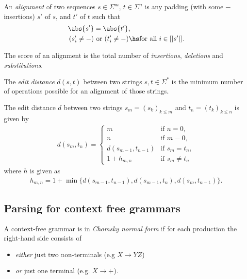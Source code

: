 \documentclass{article}
\begin{document}
\begin{definition}
	An \emph{alignment} of two sequences $s\in\Sigma^m$, $t\in\Sigma^n$ is
	any padding (with some $-$ insertions) $s'$ of $s$, and $t'$ of $t$ such that
	\begin{align*}
		\abs{s'}&=\abs{t'},\\
		(s'_i\not=-)&\text{ or }(t'_i\not=-)\hs\text{for all }i\in[|s'|].
	\end{align*}
\end{definition}

\begin{definition}
	The score of an alignment is the total number of \emph{insertions},
	\emph{deletions} and \emph{substitutions}.
\end{definition}

\begin{definition}
	The \emph{edit distance} $d(s,t)$ between two strings $s,t\in\Sigma^*$ is the
	minimum number of operations possible for an alignment of those strings.
\end{definition}

\begin{theorem}
	The edit distance $d$ between two strings $s_m=(s_k)_{k\leq m}$ 
	and $t_n=(t_k)_{k\leq n}$ is given by 
	\begin{align*}
		d(s_m,t_n) = \begin{cases}
			m &\text{if }n=0,\\
			n &\text{if }m=0,\\
			d(s_{m-1}, t_{n-1}) &\text{if }s_m=t_n,\\
			1 + h_{m,n} &\text{if }s_m\not=t_n
		\end{cases}
	\end{align*}
	where $h$ is given as
	\begin{align*}
		h_{m,n}= 1 + \min\{d(s_{m-1},t_{n-1}), d(s_{m-1}, t_n), d(s_m, t_{n-1})\}.	
	\end{align*}
\end{theorem}

\subsection{Parsing for context free grammars}

\begin{definition}
	A context-free grammar is in \emph{Chomsky normal form} if for
	each production the right-hand side consists of
	\begin{itemize}
		\item \emph{either} just two non-terminals (e.g $X\to YZ$)
		\item \emph{or} just one terminal (e.g. $X\to +$).
	\end{itemize}
\end{definition}
\end{document}
